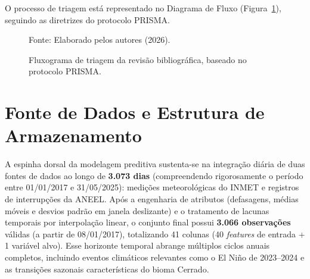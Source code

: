 O processo de triagem está representado no Diagrama de Fluxo (Figura~\ref{fig:prisma_flowchart}), seguindo as diretrizes do protocolo PRISMA.

\begin{figure}[H]
\centering
{}
\caption[Fluxograma de triagem bibliográfica (PRISMA)]{Fluxograma de triagem da revisão bibliográfica, baseado no protocolo PRISMA.}
\small{Fonte: Elaborado pelos autores (2026).}
\label{fig:prisma_flowchart}
\end{figure}



\section{Fonte de Dados e Estrutura de Armazenamento}\label{sec:bases}

A espinha dorsal da modelagem preditiva sustenta-se na integração diária de duas fontes de dados ao longo de \textbf{3.073 dias} (compreendendo rigorosamente o período entre 01/01/2017 e 31/05/2025): medições meteorológicas do INMET e registros de interrupções da ANEEL. Após a engenharia de atributos (defasagens, médias móveis e desvios padrão em janela deslizante) e o tratamento de lacunas temporais por interpolação linear, o conjunto final possui \textbf{3.066 observações} válidas (a partir de 08/01/2017), totalizando 41 colunas (40 \textit{features} de entrada + 1 variável alvo). Esse horizonte temporal abrange múltiplos ciclos anuais completos, incluindo eventos climáticos relevantes como o El Niño de 2023--2024 e as transições sazonais características do bioma Cerrado.


